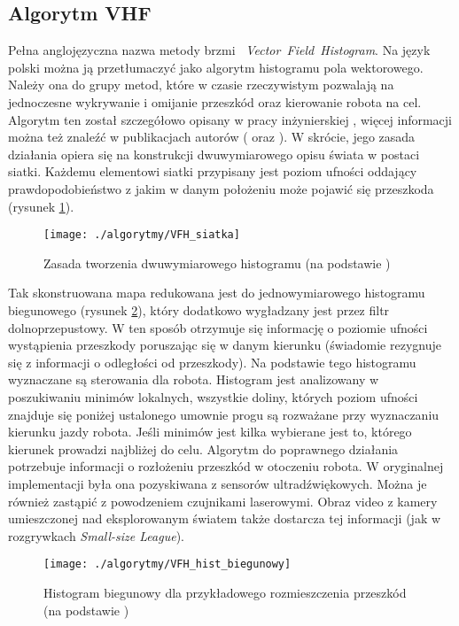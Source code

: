 \subsection{Algorytm VHF}
	Pełna  anglojęzyczna nazwa metody brzmi \mbox{ \emph{Vector Field Histogram}}. Na język polski można ją
	przetłumaczyć jako algorytm histogramu pola wektorowego. Należy ona do grupy metod, które w czasie
	rzeczywistym pozwalają na jednoczesne wykrywanie i omijanie przeszkód oraz kierowanie robota na cel.
	Algorytm ten został szczegółowo opisany w pracy inżynierskiej \cite{inzynierka}, więcej informacji można też znaleźć w publikacjach autorów (\cite{VFH_1} oraz \cite{VFH_2}).
	W skrócie, jego zasada działania opiera się na konstrukcji dwuwymiarowego opisu świata w postaci siatki. Każdemu elementowi siatki przypisany jest poziom ufności oddający prawdopodobieństwo
	z jakim w danym położeniu może pojawić się przeszkoda (rysunek \ref{fig:VFH_siatka}).
	\begin{figure}[H]
	\centering
	\texttt{[image: ./algorytmy/VFH\_siatka]}
	\caption{ Zasada tworzenia dwuwymiarowego histogramu \newline(na podstawie \cite{VFH_2})}\label{fig:VFH_siatka}
	\end{figure}
	Tak skonstruowana mapa redukowana jest do jednowymiarowego histogramu biegunowego (rysunek \ref{fig:VFH_hist_biegunowy}), który dodatkowo wygładzany jest przez
	filtr dolnoprzepustowy. W ten sposób otrzymuje się informację o poziomie ufności wystąpienia przeszkody poruszając się w danym kierunku (świadomie rezygnuje się z informacji o odległości od przeszkody).
	Na podstawie tego histogramu wyznaczane są sterowania dla robota. Histogram jest analizowany w poszukiwaniu minimów lokalnych, wszystkie doliny, których poziom ufności
	znajduje się poniżej ustalonego umownie progu są rozważane przy wyznaczaniu kierunku jazdy robota. Jeśli minimów jest kilka wybierane jest to, którego kierunek prowadzi najbliżej
	do celu. 
	Algorytm do poprawnego działania  potrzebuje informacji o rozłożeniu przeszkód w otoczeniu robota. W oryginalnej implementacji była ona pozyskiwana z sensorów ultradźwiękowych.
	Można je również zastąpić z powodzeniem czujnikami laserowymi. Obraz video z kamery umieszczonej nad eksplorowanym światem także dostarcza tej informacji (jak w rozgrywkach \emph{Small-size League}).
	\begin{figure}[H]
	\centering
	\texttt{[image: ./algorytmy/VFH\_hist\_biegunowy]}
	\caption{ Histogram biegunowy dla przykładowego rozmieszczenia przeszkód \newline(na podstawie \cite{ISR})}\label{fig:VFH_hist_biegunowy}
	\end{figure}


